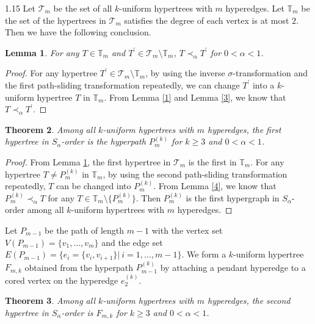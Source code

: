 \documentclass[preprint,12pt]{elsarticle1}
\newtheorem{thm}{Theorem}[section]
\newtheorem{lem}[thm]{Lemma}
\numberwithin{equation}{section}
\begin{document}
\begin{spacing}{1.15}
Let $\mathcal{T}_{m}$ be the set of all $k$-uniform hypertrees with $m$ hyperedges.
Let $\mathbb{T}_{m}$ be the set of the hypertrees in $\mathcal{T}_{m}$ satisfies the degree of each vertex is at most $2$.
Then we have the following conclusion.

\begin{lem}\label{Tt}
For any $T\in\mathbb{T}_m$ and $T^{'}\in\mathcal{T}_{m}\setminus\mathbb{T}_{m}$, $T\prec_{\alpha}T^{'}$ for $0<\alpha<1$.
\end{lem}

\begin{proof}
For any hypertree $T^{'}\in\mathcal{T}_{m}\setminus\mathbb{T}_{m}$, by using the inverse $\sigma$-transformation
and the first path-sliding transformation repeatedly, we can change $T^{'}$ into a $k$-uniform hypertree $T$ in $\mathbb{T}_m$.
From Lemma \ref{1} and Lemma \ref{3},
we know that $T\prec_{\alpha}T^{'}$.
\end{proof}

\begin{thm}\label{firsttree}
Among all $k$-uniform hypertrees with $m$ hyperedges, the first hypertree in $S_{\alpha}$-order is the hyperpath $P_m^{(k)}$ for $k\ge3$ and $0<\alpha<1$.
\end{thm}

\begin{proof}
From Lemma \ref{Tt}, the first hypertree in $\mathcal{T}_{m}$ is the first in $\mathbb{T}_{m}$.
For any hypertree $T\neq P_{m}^{(k)}$ in $\mathbb{T}_m$, by using the second path-sliding transformation repeatedly, $T$ can be changed into $P_m^{(k)}$.
From Lemma \ref{4}, we know that $P_{m}^{(k)}\prec_{\alpha}T$ for any $T\in\mathbb{T}_{m}\setminus\{P_{m}^{(k)}\}$.
Then $P_m^{(k)}$ is the first hypergraph in $S_{\alpha}$-order among all $k$-uniform hypertrees with $m$ hyperedges.
\end{proof}

Let $P_{m-1}$ be the path of length $m-1$ with the vertex set $V(P_{m-1})=\{v_1,\ldots,v_{m}\}$ and the edge set $E(P_{m-1})=\{e_i=\{v_i,v_{i+1}\}|\ i=1,\ldots,m-1\}$.
We form a $k$-uniform hypertree $F_{m,k}$ obtained from the hyperpath $P_{m-1}^{(k)}$ by attaching a pendant hyperedge to a cored vertex on the hyperedge $e_2^{(k)}$.

\begin{thm}\label{secondtree}
Among all $k$-uniform hypertrees with $m$ hyperedges, the second hypertree in $S_{\alpha}$-order is $F_{m,k}$ for $k\ge3$ and $0<\alpha<1$.
\end{thm}


\end{spacing}
\end{document}
